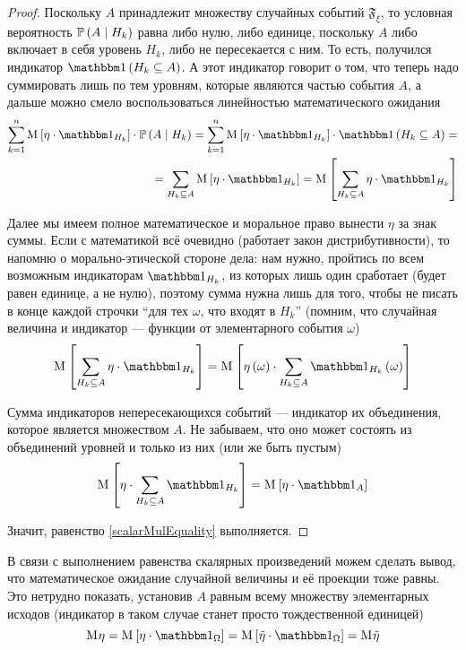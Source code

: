 \begin{proof}
Поскольку $A$ принадлежит множеству случайных событий $\mathfrak{F}_\xi$,
то условная вероятность $\mathbb{P}\left( A\mid H_k \right)$ равна либо нулю, либо единице,
поскольку $A$ либо включает в себя уровень $H_k$, либо не пересекается с ним.
То есть, получился индикатор $\indicator{H_k \subseteq A}$.
А этот индикатор говорит о том, что теперь надо суммировать лишь по тем уровням,
которые являются частью события $A$,
а дальше можно смело воспользоваться линейностью математического ожидания
\begin{align*}
\sum_{k=1}^n \Mean{ \eta \cdot \indicatorof{H_k} }
    \cdot \probability{A \mid H_k}
    = \sum_{k=1}^n \Mean{ \eta \cdot \indicatorof{H_k} }
        \cdot \indicator{H_k \subseteq A} = \\
    = \sum_{H_k \subseteq A} \Mean{ \eta \cdot \indicatorof{H_k} }
    = \Mean{ \sum_{H_k \subseteq A} \eta \cdot \indicatorof{H_k} }
\end{align*}

Далее мы имеем полное математическое и моральное право
вынести $\eta$ за знак суммы.
Если с математикой всё очевидно (работает закон дистрибутивности),
то напомню о морально-этической стороне дела: нам нужно,
пройтись по всем возможным индикаторам $\indicatorof{H_k}$,
из которых лишь один сработает (будет равен единице, а не нулю),
поэтому сумма нужна лишь для того,
чтобы не писать в конце каждой строчки ``для тех $\omega$, что входят в $H_k$''
(помним, что случайная величина и индикатор --- функции
от элементарного события $\omega$)
$$\Mean{ \sum_{H_k \subseteq A} \eta \cdot \indicatorof{H_k} }
    = \Mean{\eta \left( \omega \right) \cdot \sum_{H_k \subseteq A}
        \indicatorof{H_k}\left( \omega \right)}$$

Сумма индикаторов непересекающихся событий --- индикатор их объединения,
которое является множеством $A$.
Не забываем, что оно может состоять из объединений уровней и только из них
(или же быть пустым)
$$\Mean{ \eta \cdot \sum_{H_k \subseteq A} \indicatorof{H_k} }
    = \Mean{ \eta \cdot \indicatorof{A} }$$

Значит, равенство \eqref{scalarMulEquality} выполняется.
\end{proof}

\begin{remark}
    В связи с выполнением равенства скалярных произведений можем сделать вывод,
    что математическое ожидание случайной величины и её проекции тоже равны.
    Это нетрудно показать,
    установив $A$ равным всему множеству элементарных исходов
    (индикатор в таком случае станет просто тождественной единицей)
    $$\mean{\eta}
        = \Mean{ \eta \cdot \indicatorof{\Omega} }
        = \Mean{ \tilde{\eta} \cdot \indicatorof{\Omega} }
        = \mean{ \tilde{\eta} }$$
\end{remark}

